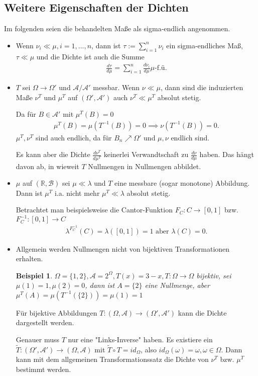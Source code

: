 \documentclass[]{article}
\newtheorem*{example}{Beispiel}
\begin{document}
\subsection{Weitere Eigenschaften der Dichten}
Im folgenden seien die behandelten Maße als sigma-endlich angenommen.
\begin{itemize}
	\item Wenn $\nu_i \ll \mu, i=1,...,n$, dann ist $\tau := \sum_{i=1}^{n}\nu_i$ ein sigma-endliches Maß, $\tau \ll \mu$ und die Dichte ist auch die Summe
	\begin{align*}
		\frac{d\tau}{d\mu} = \sum_{i=1}^{n} \frac{d\nu_i}{d\mu} \mu\text{-f.ü.}
	\end{align*}

	\item $T$ sei $\Omega\rightarrow\Omega'$ und $\mathcal{A}/\mathcal{A}'$ messbar. Wenn $\nu \ll \mu$, dann sind die induzierten Maße $\nu^T$ und $\mu^T$ auf $(\Omega', \mathcal{A}')$ auch $\nu^T \ll \mu^T$ absolut stetig.
	
	Da für $B \in \mathcal{A}'$ mit $\mu^T(B) = 0$
	\begin{align*}
		\mu^T(B) = \mu(T^{-1}(B)) = 0 \implies \nu(T^{-1}(B)) = 0.
	\end{align*}
	$\mu^T,\nu^T$ sind auch endlich, da für $B_n\nearrow\Omega'$ und $\mu,\nu$ endlich sind.
	
	Es kann aber die Dichte $\frac{d\nu^T}{d\mu^T}$ keinerlei Verwandtschaft zu $\frac{d\nu}{d\mu}$ haben. Das hängt davon ab, in wieweit $T$ Nullmengen in Nullmengen abbildet.
	
	\item $\mu$ auf $(\mathbb{R}, \mathcal{B})$ sei $\mu \ll \lambda$ und $T$ eine messbare (sogar monotone) Abbildung. Dann ist $\mu^T$ i.a. nicht mehr $\mu^T \ll \lambda$ absolut stetig.
	
	Betrachtet man beispielsweise die Cantor-Funktion $F_C:C\rightarrow[0,1]$ bzw. $F_C^{-1}:[0,1]\rightarrow C$
	\begin{align*}
		\lambda^{F_C^{-1}}(C) = \lambda([0,1]) = 1 \text{ aber } \lambda(C) = 0.
	\end{align*}

	\item Allgemein werden Nullmengen nicht von bijektiven Transformationen erhalten.
	
	\begin{example}
		$\Omega=\{1,2\}, \mathcal{A}=2^\Omega, T(x)=3-x, T:\Omega\rightarrow\Omega$ bijektiv, sei $\mu({1})=1, \mu({2}) = 0$, dann ist $A=\{2\}$ eine Nullmenge, aber $\mu^T(A)=\mu(T^{-1}(\{2\}))=\mu({1})=1$
	\end{example}

	Für bijektive Abbildungen $T:(\Omega,\mathcal{A})\rightarrow(\Omega', \mathcal{A}')$ kann die Dichte dargestellt werden.
	
	Genauer muss $T$ nur eine "Links-Inverse" haben. Es existiere ein $\tilde{T}:(\Omega',\mathcal{A}')\rightarrow(\Omega,\mathcal{A})$ mit $\tilde{T}\circ T = id_\Omega$, also $id_\Omega(\omega)=\omega, \omega\in \Omega$. Dann kann mit dem allgemeinen Transformationssatz die Dichte von $\nu^T$ bzw. $\mu^T$ bestimmt werden.
\end{itemize}
\end{document}
